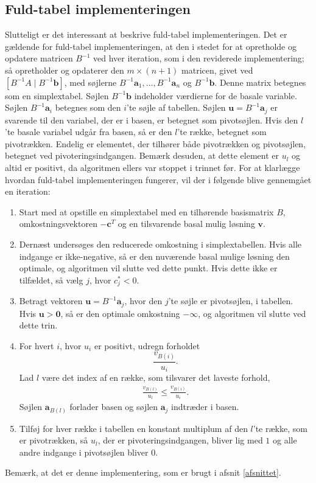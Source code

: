 \subsection{Fuld-tabel implementeringen}
Slutteligt er det interessant at beskrive fuld-tabel implementeringen. 
Det er gældende for fuld-tabel implementeringen, at den i stedet for at opretholde og opdatere matricen $B^{-1}$ ved hver iteration, som i den reviderede implementering; 
så opretholder og opdaterer den $m \times (n+1)$ matricen, givet ved $\left [ B^{-1} A \mid B^{-1} \mathbf{b} \right ]$, med søjlerne $B^{-1}\mathbf{a}_1,\ldots,B^{-1}\mathbf{a}_n$ og $B^{-1}\mathbf{b}$. 
Denne matrix betegnes som en simplextabel.
Søjlen $B^{-1}\mathbf{b}$ indeholder værdierne for de basale variable.
Søjlen $B^{-1}\mathbf{a}_i$ betegnes som den $i$'te søjle af tabellen.
Søjlen $\mathbf{u} = B^{-1}\mathbf{a}_j$ er svarende til den variabel, der er i basen, er betegnet som pivotsøjlen. 
Hvis den $l$'te basale variabel udgår fra basen, så er den $l$'te række, betegnet som pivotrækken.
Endelig er elementet, der tilhører både pivotrækken og pivotsøjlen, betegnet ved pivoteringsindgangen.
Bemærk desuden, at dette element er $u_l$ og altid er positivt, da algoritmen ellers var stoppet i trinnet før. 
For at klarlægge hvordan fuld-tabel implementeringen fungerer, vil der i følgende blive gennemgået en iteration: 
%
\begin{tcolorbox}[
title=Fuld-tabel implementering,
colback		= myblue!15,
colframe	= myblue!15,
coltitle	= black,
before skip	= 20pt plus 2pt,
after skip	= 20pt plus 2pt,
fonttitle	= \bfseries]
\begin{enumerate}
\item Start med at opstille en simplextabel med en tilhørende  basismatrix $B$, omkostningsvektoren $-\textbf{c}^T$ og en tilsvarende basal mulig løsning $\mathbf{v}.$
\item Dernæst undersøges den reducerede omkostning i simplextabellen.
Hvis alle indgange er ikke-negative, så er den nuværende basal mulige løsning den optimale, og algoritmen vil slutte ved dette punkt.
Hvis dette ikke er tilfældet, så vælg $j$, hvor $c_j^* < 0$.
\item Betragt vektoren $\mathbf{u}=B^{-1}\mathbf{a}_j$, hvor den $j$'te søjle er pivotsøjlen, i tabellen.
Hvis $\mathbf{u} > \textbf{0}$, så er den optimale omkostning $-\infty$, og algoritmen vil slutte ved dette trin. 
\item For hvert $i$, hvor $u_i$ er positivt, udregn forholdet $$\frac{v_{B(i)}}{u_i}.$$ 
Lad $l$ være det index af en række, som tilsvarer det laveste forhold,
\begin{align*}
\frac{v_{B(l)}}{u_l} \leq \frac{v_{B(i)}}{u_i}.
\end{align*}
Søjlen $\mathbf{a}_{B(l)}$ forlader basen og søjlen $\mathbf{a}_j$ indtræder i basen. 
\item Tilføj for hver række i tabellen en konstant multiplum af den $l$'te række, som er pivotrækken, så $u_l$, der er pivoteringsindgangen, bliver lig med $1$ og alle andre indgange i pivotsøjlen bliver $0$. 
\end{enumerate}
\end{tcolorbox}
\noindent
%
Bemærk, at det er denne implementering, som er brugt i afsnit \ref{afsnittet}.
\newpage